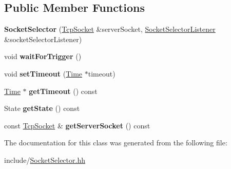 \subsection*{Public Member Functions}
\begin{DoxyCompactItemize}
\item 
\hypertarget{classmognetwork_1_1_socket_selector_ac8234852e4c0331bda4bb6f7652fc577}{{\bfseries Socket\-Selector} (\hyperlink{classmognetwork_1_1_tcp_socket}{Tcp\-Socket} \&server\-Socket, \hyperlink{classmognetwork_1_1_socket_selector_listener}{Socket\-Selector\-Listener} \&socket\-Selector\-Listener)}\label{classmognetwork_1_1_socket_selector_ac8234852e4c0331bda4bb6f7652fc577}

\item 
\hypertarget{classmognetwork_1_1_socket_selector_a3fe05bc9c20816c29cf37bc7be726c33}{void {\bfseries wait\-For\-Trigger} ()}\label{classmognetwork_1_1_socket_selector_a3fe05bc9c20816c29cf37bc7be726c33}

\item 
\hypertarget{classmognetwork_1_1_socket_selector_a9faab8e39bb69a7812f7cffc1a1df8bf}{void {\bfseries set\-Timeout} (\hyperlink{_selector_8hh_af47ac292ef7224cf549b944d138ba4ae}{Time} $\ast$timeout)}\label{classmognetwork_1_1_socket_selector_a9faab8e39bb69a7812f7cffc1a1df8bf}

\item 
\hypertarget{classmognetwork_1_1_socket_selector_a2f3b8e6214ddd0568182a49080cbd4bf}{\hyperlink{_selector_8hh_af47ac292ef7224cf549b944d138ba4ae}{Time} $\ast$ {\bfseries get\-Timeout} () const }\label{classmognetwork_1_1_socket_selector_a2f3b8e6214ddd0568182a49080cbd4bf}

\item 
\hypertarget{classmognetwork_1_1_socket_selector_a3403ba6262684fdabb84d67788bd5498}{State {\bfseries get\-State} () const }\label{classmognetwork_1_1_socket_selector_a3403ba6262684fdabb84d67788bd5498}

\item 
\hypertarget{classmognetwork_1_1_socket_selector_a0703a1875f67597993b4291119171197}{const \hyperlink{classmognetwork_1_1_tcp_socket}{Tcp\-Socket} \& {\bfseries get\-Server\-Socket} () const }\label{classmognetwork_1_1_socket_selector_a0703a1875f67597993b4291119171197}

\end{DoxyCompactItemize}


The documentation for this class was generated from the following file\-:\begin{DoxyCompactItemize}
\item 
include/\hyperlink{_socket_selector_8hh}{Socket\-Selector.\-hh}\end{DoxyCompactItemize}
